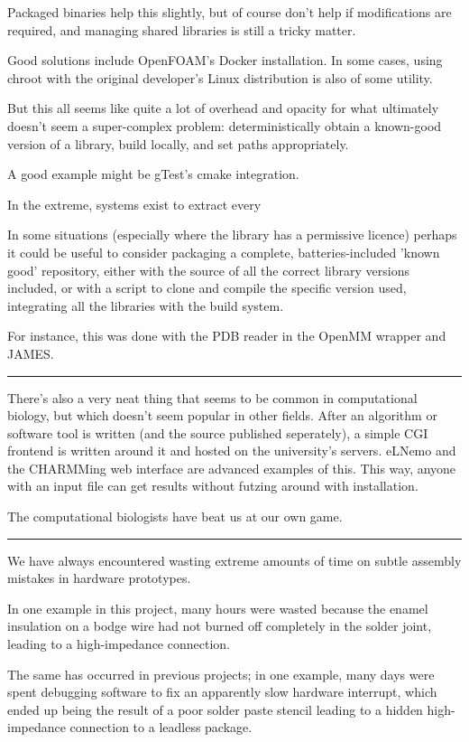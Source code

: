 \documentclass[paper.tex]{subfiles}
\begin{document}
Packaged binaries help this slightly, but of course don't help if modifications are required, and managing shared libraries is still a tricky matter.

Good solutions include OpenFOAM's Docker installation. In some cases, using chroot with the original developer's Linux distribution is also of some utility.

But this all seems like quite a lot of overhead and opacity for what ultimately doesn't seem a super-complex problem: deterministically obtain a known-good version of a library, build locally, and set paths appropriately.

A good example might be gTest's cmake integration.

In the extreme, systems exist to extract every 

In some situations (especially where the library has a permissive licence) perhaps it could be useful to consider packaging a complete, batteries-included 'known good' repository, either with the source of all the correct library versions included, or with a script to clone and compile the specific version used, integrating all the libraries with the build system. 

For instance, this was done with the PDB reader in the OpenMM wrapper and JAMES.

\rule{\linewidth}{0.2pt}

There's also a very neat thing that seems to be common in computational biology, but which doesn't seem popular in other fields. After an algorithm or software tool is written (and the source published seperately), a simple CGI frontend is written around it and hosted on the university's servers. eLNemo and the CHARMMing web interface are advanced examples of this. This way, anyone with an input file can get results without futzing around with installation. 

The computational biologists have beat us at our own game.

\rule{\linewidth}{0.2pt}

We have always encountered wasting extreme amounts of time on subtle assembly mistakes in hardware prototypes. 

In one example in this project, many hours were wasted because the enamel insulation on a bodge wire had not burned off completely in the solder joint, leading to a high-impedance connection.

The same has occurred in previous projects; in one example, many days were spent debugging software to fix an apparently slow hardware interrupt, which ended up being the result of a poor solder paste stencil leading to a hidden high-impedance connection to a leadless package.
\end{document}
